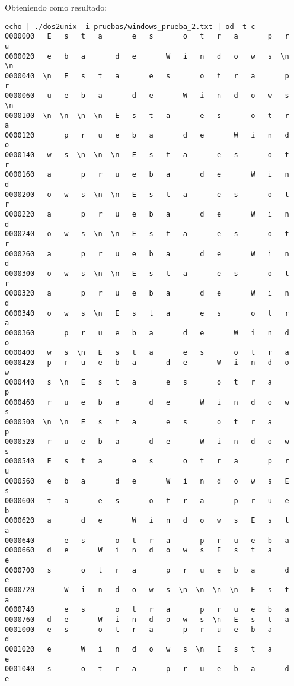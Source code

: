 \documentclass[a4paper,11pt]{article}
\begin{document}
\begin{itemize}
Obteniendo como resultado:
\begin{verbatim}
echo | ./dos2unix -i pruebas/windows_prueba_2.txt | od -t c
0000000   E   s   t   a       e   s       o   t   r   a       p   r   u
0000020   e   b   a       d   e       W   i   n   d   o   w   s  \n  \n
0000040  \n   E   s   t   a       e   s       o   t   r   a       p   r
0000060   u   e   b   a       d   e       W   i   n   d   o   w   s  \n
0000100  \n  \n  \n  \n   E   s   t   a       e   s       o   t   r   a
0000120       p   r   u   e   b   a       d   e       W   i   n   d   o
0000140   w   s  \n  \n  \n   E   s   t   a       e   s       o   t   r
0000160   a       p   r   u   e   b   a       d   e       W   i   n   d
0000200   o   w   s  \n  \n   E   s   t   a       e   s       o   t   r
0000220   a       p   r   u   e   b   a       d   e       W   i   n   d
0000240   o   w   s  \n  \n   E   s   t   a       e   s       o   t   r
0000260   a       p   r   u   e   b   a       d   e       W   i   n   d
0000300   o   w   s  \n  \n   E   s   t   a       e   s       o   t   r
0000320   a       p   r   u   e   b   a       d   e       W   i   n   d
0000340   o   w   s  \n   E   s   t   a       e   s       o   t   r   a
0000360       p   r   u   e   b   a       d   e       W   i   n   d   o
0000400   w   s  \n   E   s   t   a       e   s       o   t   r   a    
0000420   p   r   u   e   b   a       d   e       W   i   n   d   o   w
0000440   s  \n   E   s   t   a       e   s       o   t   r   a       p
0000460   r   u   e   b   a       d   e       W   i   n   d   o   w   s
0000500  \n  \n   E   s   t   a       e   s       o   t   r   a       p
0000520   r   u   e   b   a       d   e       W   i   n   d   o   w   s
0000540   E   s   t   a       e   s       o   t   r   a       p   r   u
0000560   e   b   a       d   e       W   i   n   d   o   w   s   E   s
0000600   t   a       e   s       o   t   r   a       p   r   u   e   b
0000620   a       d   e       W   i   n   d   o   w   s   E   s   t   a
0000640       e   s       o   t   r   a       p   r   u   e   b   a    
0000660   d   e       W   i   n   d   o   w   s   E   s   t   a       e
0000700   s       o   t   r   a       p   r   u   e   b   a       d   e
0000720       W   i   n   d   o   w   s  \n  \n  \n  \n   E   s   t   a
0000740       e   s       o   t   r   a       p   r   u   e   b   a    
0000760   d   e       W   i   n   d   o   w   s  \n   E   s   t   a    
0001000   e   s       o   t   r   a       p   r   u   e   b   a       d
0001020   e       W   i   n   d   o   w   s  \n   E   s   t   a       e
0001040   s       o   t   r   a       p   r   u   e   b   a       d   e

\end{verbatim}
\end{itemize}
\end{document}
